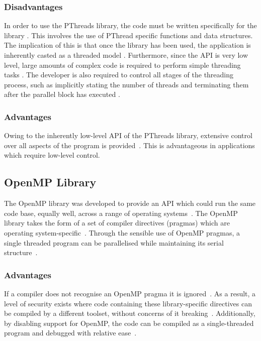 \documentclass[10pt,twocolumn]{witseiepaper}
\begin{document}
\begin{appendix}
\subsubsection{Disadvantages}
In order to use the PThreads library, the code must be written specifically for the library \cite{pthreadVSopen}. This involves the use of PThread specific functions and data structures. The implication of this is that once the library has been used, the application is inherently casted as a threaded model \cite{pthreadVSopen}. Furthermore, since the API is very low level, large amounts of complex code is required to perform simple threading tasks \cite{pthreadVSopen}. The developer is also required to control all stages of the threading process, such as implicitly stating the number of threads and terminating them after the parallel block has executed \cite{pthreadVSopen}.

\subsubsection{Advantages}
Owing to the inherently low-level API of the PThreads library, extensive control over all aspects of the program is provided~\cite{pthreadVSopen}. This is advantageous in applications which require low-level control.

\subsection{OpenMP Library}
The OpenMP library was developed to provide an API which could run the same code base, equally well, across a range of operating systems~\cite{pthreadVSopen}. The OpenMP library takes the form of a set of compiler directives (pragmas) which are operating system-specific~\cite{pthreadVSopen}. Through the sensible use of OpenMP pragmas, a single threaded program can be parallelised while maintaining its serial structure~\cite{kuhn2000openmp,pthreadVSopen}.

\subsubsection{Advantages}
If a compiler does not recognise an OpenMP pragma it is ignored~\cite{HPC}. As a result, a level of security exists where code containing these library-specific directives can be compiled by a different toolset, without concerns of it breaking~\cite{pthreadVSopen}. Additionally, by disabling support for OpenMP, the code can be compiled as a single-threaded program and debugged with relative ease~\cite{pthreadVSopen}.


\end{appendix}
\end{document}
